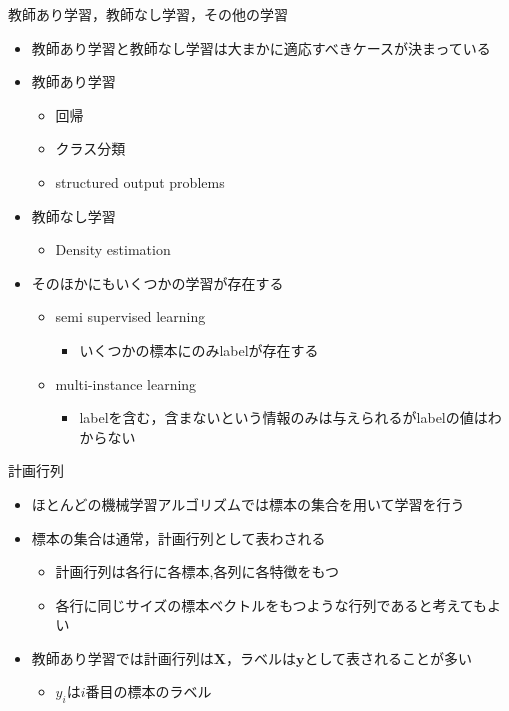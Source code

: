 \documentclass[dvipdfmx, 10pt]{beamer}
\begin{document}

\begin{frame}{教師あり学習，教師なし学習，その他の学習}
  \begin{itemize}
    \item 教師あり学習と教師なし学習は大まかに適応すべきケースが決まっている
    \item 教師あり学習
    \begin{itemize}
      \item 回帰
      \item クラス分類
      \item structured output problems
    \end{itemize}
    \item 教師なし学習
    \begin{itemize}
      \item Density estimation
    \end{itemize}
    \item そのほかにもいくつかの学習が存在する
    \begin{itemize}
      \item semi supervised learning
      \begin{itemize}
        \item いくつかの標本にのみlabelが存在する
      \end{itemize}
      \item multi-instance learning
      \begin{itemize}
        \item labelを含む，含まないという情報のみは与えられるがlabelの値はわからない
      \end{itemize}
    \end{itemize}
  \end{itemize}
\end{frame}


\begin{frame}{計画行列}
  \begin{itemize}
    \item ほとんどの機械学習アルゴリズムでは標本の集合を用いて学習を行う
    \item 標本の集合は通常，計画行列として表わされる
    \begin{itemize}
      \item 計画行列は各行に各標本,各列に各特徴をもつ
      \item 各行に同じサイズの標本ベクトルをもつような行列であると考えてもよい
    \end{itemize}
  \item 教師あり学習では計画行列は$\bm{X}$，ラベルは$\bm{y}$として表されることが多い
  \begin{itemize}
    \item $y_{i}$は$i$番目の標本のラベル
  \end{itemize}
  \end{itemize}
\end{frame}
\end{document}
